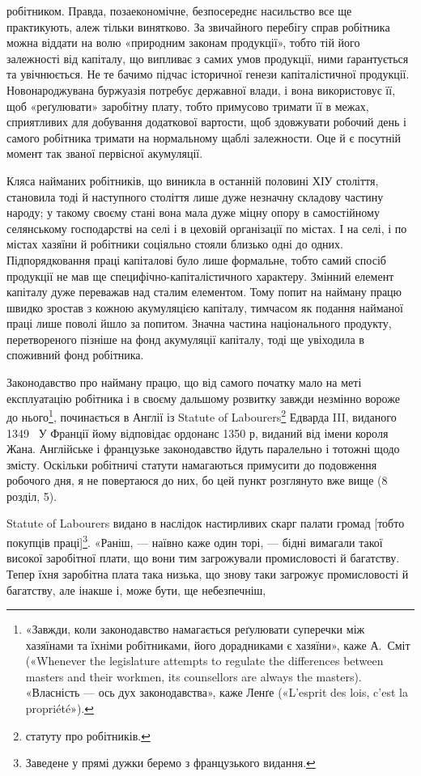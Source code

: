 \parcont{}  %
робітником. Правда, позаекономічне, безпосереднє насильство
все ще практикують, алеж тільки винятково. За звичайного
перебігу справ робітника можна віддати на волю «природним
законам продукції», тобто тій його залежності від капіталу,
що випливає з самих умов продукції, ними ґарантується та увічнюється.
Не те бачимо підчас історичної генези капіталістичної
продукції. Новонароджувана буржуазія потребує державної
влади, і вона використовує її, щоб «реґулювати» заробітну плату,
тобто примусово тримати її в межах, сприятливих для добування
додаткової вартости, щоб здовжувати робочий день і самого робітника
тримати на нормальному щаблі залежности. Оце й є
посутній момент так званої первісної акумуляції.

Кляса найманих робітників, що виникла в останній половині
ХІУ століття, становила тоді й наступного століття лише дуже
незначну складову частину народу; у такому своєму стані вона
мала дуже міцну опору в самостійному селянському господарстві
на селі і в цеховій організації по містах. І на селі, і по містах
хазяїни й робітники соціяльно стояли близько одні до одних.
Підпорядковання праці капіталові було лише формальне, тобто
самий спосіб продукції не мав ще специфічно-капіталістичного
характеру. Змінний елемент капіталу дуже переважав над сталим
елементом. Тому попит на найману працю швидко зростав
з кожною акумуляцією капіталу, тимчасом як подання найманої
праці лише поволі йшло за попитом. Значна частина національного
продукту, перетвореного пізніше на фонд акумуляції капіталу,
тоді ще увіходила в споживний фонд робітника.

Законодавство про найману працю, що від самого початку
мало на меті експлуатацію робітника і в своєму дальшому розвитку
завжди незмінно вороже до нього\footnote{
«Завжди, коли законодавство намагається реґулювати суперечки
між хазяїнами та їхніми робітниками, його дорадниками є хазяїни», каже
А.~Сміт («Whenever the legislature attempts to regulate the differences
between masters and their workmen, its counsellors are always the masters).
«Власність — ось дух законодавства», каже Ленґе («L’esprit des
lois, c’est la propriété»).
}, починається в Англії
із Statute of Labourers\footnote*{
статуту про робітників. 
} Едварда III, виданого 1349~ У Франції
йому відповідає ордонанс 1350 р, виданий від імени короля
Жана. Англійське і французьке законодавство йдуть паралельно
і тотожні щодо змісту. Оскільки робітничі статути намагаються
примусити до подовження робочого дня, я не повертаюся до них,
бо цей пункт розглянуто вже вище (8 розділ, 5).

Statute of Labourers видано в наслідок настирливих скарг
палати громад [тобто покупців праці]\footnote*{
Заведене у прямі дужки беремо з французького видання. 
}. «Раніш, — наївно каже
один торі, — бідні вимагали такої високої заробітної плати, що
вони тим загрожували промисловості й багатству. Тепер їхня
заробітна плата така низька, що знову таки загрожує промисловості
й багатству, але інакше і, може бути, ще небезпечніш,
\parbreak{}  %
